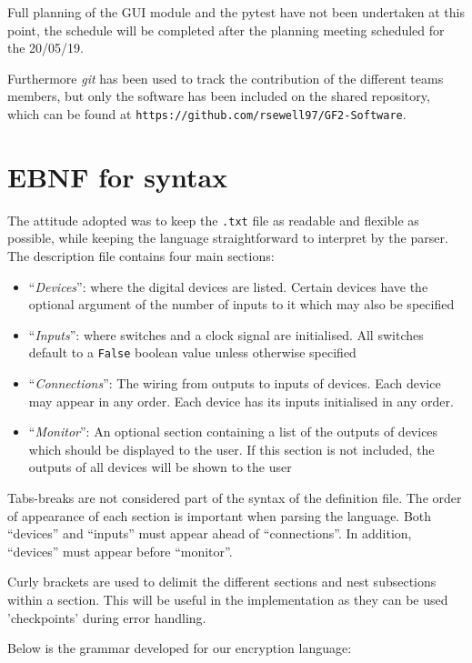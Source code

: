 \documentclass[12pt]{article}
\begin{document}
Full planning of the GUI module and the pytest have not been undertaken at this point, the schedule will be completed after the planning meeting scheduled for the 20/05/19. 

Furthermore \textit{git} has been used to track the contribution of the different teams members, but only the software has been included on the shared repository, which can be found at \texttt{https://github.com/rsewell97/GF2-Software}.

 
\section{EBNF for syntax}

The attitude adopted was to keep the \texttt{.txt} file as readable and flexible as possible, while keeping the language straightforward to interpret by the parser. 
\\
The description file contains four main sections:
\begin{itemize}
\item “\textit{Devices}”: where the digital devices are listed.  Certain devices have the optional argument of the number of inputs to it which may also be specified
\item “\textit{Inputs}”: where switches and a clock signal are initialised. All switches default to a \texttt{False} boolean value unless otherwise specified
\item “\textit{Connections}”: The wiring from outputs to inputs of devices. Each device may appear in any order. Each device has its inputs initialised in any order.  
\item “\textit{Monitor}”: An optional section containing a list of the outputs of devices which should be displayed to the user. If this section is not included, the outputs of all devices will be shown to the user
\end{itemize}
Tabs-breaks are not considered part of the syntax of the definition file. The order of appearance of each section is important when parsing the language. Both “devices” and “inputs” must appear ahead of “connections”. In addition, “devices” must appear before “monitor”.

Curly brackets {} are used to delimit the different sections and nest subsections within a section. This will be useful in the implementation as they can be used 'checkpoints' during error handling.  

Below is the grammar developed for our encryption language:
\end{document}
